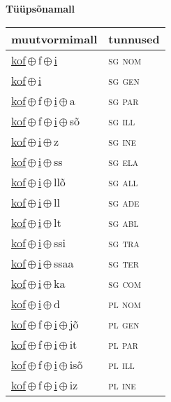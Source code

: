 

\vspace{3.5em}
\noindent \begin{minipage}{\textwidth}
\noindent \textbf{Tüüpsõnamall \,}\\

\begin{sideways}
\begin{tabular}{l l}
muutvormimall & tunnused \\
\hline
\underline{kof}\,$\oplus$\,f\,$\oplus$\,\underline{i} & \textsc{ sg nom } \\
\underline{kof}\,$\oplus$\,\underline{i} & \textsc{ sg gen } \\
\underline{kof}\,$\oplus$\,f\,$\oplus$\,\underline{i}\,$\oplus$\,a & \textsc{ sg par } \\
\underline{kof}\,$\oplus$\,f\,$\oplus$\,\underline{i}\,$\oplus$\,sõ & \textsc{ sg ill } \\
\underline{kof}\,$\oplus$\,\underline{i}\,$\oplus$\,z & \textsc{ sg ine } \\
\underline{kof}\,$\oplus$\,\underline{i}\,$\oplus$\,ss & \textsc{ sg ela } \\
\underline{kof}\,$\oplus$\,\underline{i}\,$\oplus$\,llõ & \textsc{ sg all } \\
\underline{kof}\,$\oplus$\,\underline{i}\,$\oplus$\,ll & \textsc{ sg ade } \\
\underline{kof}\,$\oplus$\,\underline{i}\,$\oplus$\,lt & \textsc{ sg abl } \\
\underline{kof}\,$\oplus$\,\underline{i}\,$\oplus$\,ssi & \textsc{ sg tra } \\
\underline{kof}\,$\oplus$\,\underline{i}\,$\oplus$\,ssaa & \textsc{ sg ter } \\
\underline{kof}\,$\oplus$\,\underline{i}\,$\oplus$\,ka & \textsc{ sg com } \\
\underline{kof}\,$\oplus$\,\underline{i}\,$\oplus$\,d & \textsc{ pl nom } \\
\underline{kof}\,$\oplus$\,f\,$\oplus$\,\underline{i}\,$\oplus$\,jõ & \textsc{ pl gen } \\
\underline{kof}\,$\oplus$\,f\,$\oplus$\,\underline{i}\,$\oplus$\,it & \textsc{ pl par } \\
\underline{kof}\,$\oplus$\,f\,$\oplus$\,\underline{i}\,$\oplus$\,isõ & \textsc{ pl ill } \\
\underline{kof}\,$\oplus$\,f\,$\oplus$\,\underline{i}\,$\oplus$\,iz & \textsc{ pl ine } \\

\end{tabular}
\end{sideways}
\end{minipage}
